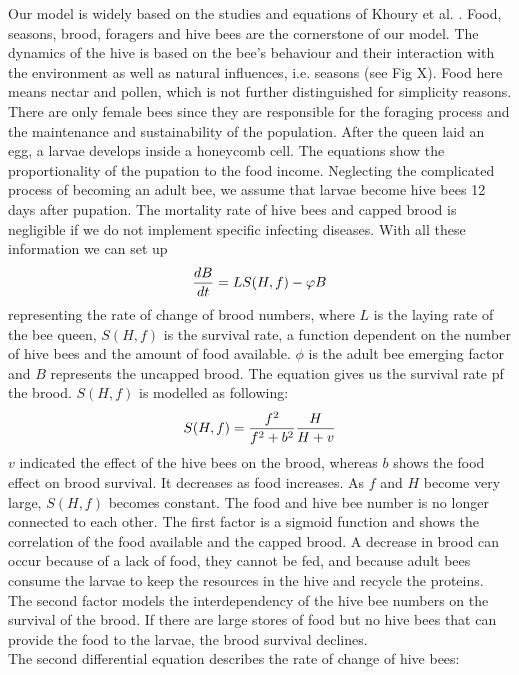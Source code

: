 Our model is widely based on the studies and equations of Khoury et al. \cite{khoury13}. Food, seasons, brood, foragers and hive bees are the cornerstone of our model. The dynamics of the hive is based on the bee's behaviour and their interaction with the environment as well as natural influences, i.e. seasons (see Fig X). Food here means nectar and pollen, which is not further distinguished for simplicity reasons. There are only female bees since they are responsible for the foraging process and the maintenance and sustainability of the population. After the queen laid an egg, a larvae develops inside a honeycomb cell. The equations show the proportionality of the pupation to the food income. Neglecting the complicated process of becoming an adult bee, we assume that larvae become hive bees 12 days after pupation. The mortality rate of hive bees and capped brood is negligible if we do not implement specific infecting diseases. With all these information we can set up
\begin{equation}\label{rate of change of brood numbers}
{dB \over dt} = LS(H,f)-\phi B
\end{equation}
representing the rate of change of brood numbers, where $L$ is the laying rate of the bee queen, $S(H,f)$ is the survival rate, a function dependent on the number of hive bees and the amount of food available. $\phi$ is the adult bee emerging factor and $B$ represents the uncapped brood. The equation gives us the survival rate pf the brood. $S(H,f)$ is modelled as following:
\begin{equation}\label{function of hive bees and food}
S(H,f)={f^2 \over f^2+b^2}{H \over H+v}
\end{equation}
$v$ indicated the effect of the hive bees on the brood, whereas $b$ shows the food effect on brood survival. It decreases as food increases. As $f$ and $H$ become very large, $S(H,f)$ becomes constant. The food and hive bee number is no longer connected to each other. The first factor is a sigmoid function and shows the correlation of the food available and the capped brood. A decrease in brood can occur because of a lack of food, they cannot be fed, and because adult bees consume the larvae to keep the resources in the hive and recycle the proteins. The second factor models the interdependency of the hive bee numbers on the survival of the brood. If there are large stores of food but no hive bees that can provide the food to the larvae, the brood survival declines.  
\\
The second differential equation describes the rate of change of hive bees:
